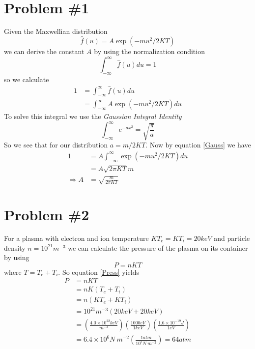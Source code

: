 \documentclass[11pt]{article}
\numberwithin{equation}{section}
\begin{document}


\section{Problem \#1}
Given the Maxwellian distribution
$$\hat{f}(u) = A\exp(-mu^2/2KT)$$
we can derive the constant $A$ by using the normalization condition
$$\int_{-\infty}^{\infty}\hat{f}(u)du = 1$$
so we calculate
\begin{align*}
1 &= \int_{-\infty}^{\infty}\hat{f}(u)du \\
&= \int_{-\infty}^{\infty} A\exp(-mu^2/2KT)du 
\end{align*}
To solve this integral we use the \emph{Gaussian Integral Identity}
\begin{equation}
\int_{-\infty}^{\infty}e^{-ax^2} = \sqrt{\frac{\pi}{a}}
\label{Gauss}
\end{equation}
So we see that for our distribution $a = m/2KT$. Now by equation \ref{Gauss} we have
\begin{align*}
1 &= A\int_{-\infty}^{\infty} \exp(-mu^2/2KT)du\\
&= A\sqrt{2\pi KT}{m}\\
\Rightarrow A &= \sqrt{\frac{m}{2\pi KT}}
\end{align*}

\section{Problem \#2}
For a plasma with electron and ion temperature $KT_{e} = KT_{i} = 20\unit{keV}$ and particle density $n = 10^{21}\unit{m^{-3}}$ we can calculate the pressure of the plasma on its container by using
\begin{equation}
P = nKT
\label{Press}
\end{equation}
where $T = T_e+T_i$. So equation \ref{Press} yields
\begin{align*}
P &= nKT\\
&= nK(T_e+T_i)\\
&= n(KT_e+KT_i)\\
&= 10^{21}\unit{m^{-3}}(20\unit{keV}+20\unit{keV})\\
&= \left(\frac{4.0\times10^{22}\unit{keV}}{\unit{m^{-3}}}\right)\left(\frac{1000\unit{eV}}{1\unit{keV}}\right)\left(\frac{1.6\times10^{-19}\unit{J}}{1\unit{eV}}\right)\\
&= 6.4\times10^{6}\unit{N\ m^{-2}}\left(\frac{1\unit{atm}}{10^5\unit{N\ m^{-2}}}\right) = 64\unit{atm}
\end{align*}
\end{document}
